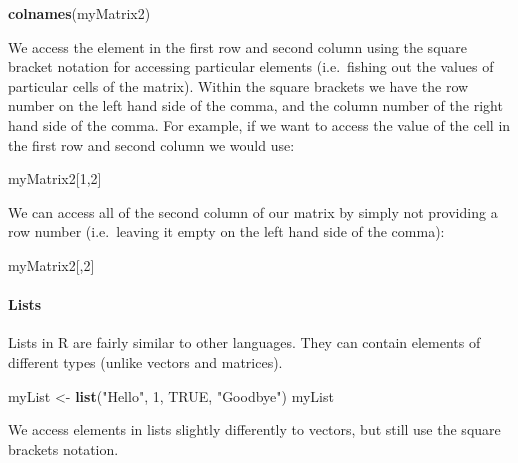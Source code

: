 \documentclass[]{article}
\newenvironment{Shaded}{\begin{snugshade}}{\end{snugshade}}
\newcommand{\DecValTok}[1]{\textcolor[rgb]{0.00,0.00,0.81}{#1}}
\newcommand{\KeywordTok}[1]{\textcolor[rgb]{0.13,0.29,0.53}{\textbf{#1}}}
\newcommand{\NormalTok}[1]{#1}
\newcommand{\OtherTok}[1]{\textcolor[rgb]{0.56,0.35,0.01}{#1}}
\newcommand{\StringTok}[1]{\textcolor[rgb]{0.31,0.60,0.02}{#1}}
\let\oldparagraph\paragraph
\renewcommand{\paragraph}[1]{\oldparagraph{#1}\mbox{}}
\begin{document}
\begin{Shaded}
\begin{Highlighting}[]
\KeywordTok{colnames}\NormalTok{(myMatrix2)}
\end{Highlighting}
\end{Shaded}

We access the element in the first row and second column using the
square bracket notation for accessing particular elements (i.e.~fishing
out the values of particular cells of the matrix). Within the square
brackets we have the row number on the left hand side of the comma, and
the column number of the right hand side of the comma. For example, if
we want to access the value of the cell in the first row and second
column we would use:

\begin{Shaded}
\begin{Highlighting}[]
\NormalTok{myMatrix2[}\DecValTok{1}\NormalTok{,}\DecValTok{2}\NormalTok{]}
\end{Highlighting}
\end{Shaded}

We can access all of the second column of our matrix by simply not
providing a row number (i.e.~leaving it empty on the left hand side of
the comma):

\begin{Shaded}
\begin{Highlighting}[]
\NormalTok{myMatrix2[,}\DecValTok{2}\NormalTok{]}
\end{Highlighting}
\end{Shaded}

\hypertarget{lists}{%
\paragraph{Lists}\label{lists}}

Lists in R are fairly similar to other languages. They can contain
elements of different types (unlike vectors and matrices).

\begin{Shaded}
\begin{Highlighting}[]
\NormalTok{myList <-}\StringTok{ }\KeywordTok{list}\NormalTok{(}\StringTok{"Hello"}\NormalTok{, }\DecValTok{1}\NormalTok{, }\OtherTok{TRUE}\NormalTok{, }\StringTok{"Goodbye"}\NormalTok{)}
\NormalTok{myList}
\end{Highlighting}
\end{Shaded}

We access elements in lists slightly differently to vectors, but still
use the square brackets notation.
\end{document}
